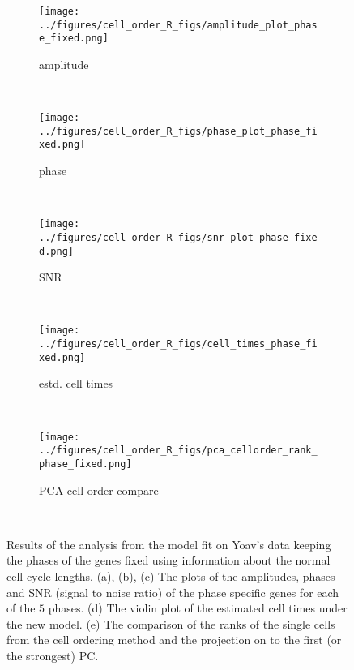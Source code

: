 \documentclass[11pt]{article}
\begin{document}
  \begin{figure*}[ht]
    \centering
     \begin{subfigure}[t]{0.5\textwidth}
        \centering
        \texttt{[image: ../figures/cell\_order\_R\_figs/amplitude\_plot\_phase\_fixed.png]}
        \caption{amplitude}
    \end{subfigure}%
    ~
    \begin{subfigure}[t]{0.5\textwidth}
        \centering
        \texttt{[image: ../figures/cell\_order\_R\_figs/phase\_plot\_phase\_fixed.png]}
        \caption{phase}
    \end{subfigure}\\

     \begin{subfigure}[t]{0.5\textwidth}
        \centering
        \texttt{[image: ../figures/cell\_order\_R\_figs/snr\_plot\_phase\_fixed.png]}
        \caption{SNR}
    \end{subfigure}%
    ~
       \begin{subfigure}[t]{0.5\textwidth}
        \centering
        \texttt{[image: ../figures/cell\_order\_R\_figs/cell\_times\_phase\_fixed.png]}
        \caption{estd. cell times }
    \end{subfigure}\\

     \begin{subfigure}[t]{0.5\textwidth}
        \centering
        \texttt{[image: ../figures/cell\_order\_R\_figs/pca\_cellorder\_rank\_phase\_fixed.png]}
        \caption{PCA cell-order compare}
    \end{subfigure}\\

    \caption{Results of the analysis from the model fit on Yoav's data keeping the phases of the genes fixed using information about the normal cell cycle lengths. (a), (b), (c) The plots of the amplitudes, phases and SNR (signal to noise ratio) of the phase specific genes for each of the $5$ phases. (d) The violin plot of the estimated cell times under the new model. (e) The comparison of the ranks of the single cells from the cell ordering method and the projection on to the first (or the strongest) PC.}
 \label{fig:fig7}
 \end{figure*}
\end{document}
